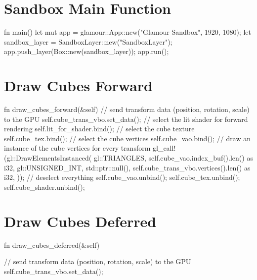 \newpage


\begin{appendices}
  \section{Sandbox Main Function}\label{app:sandbox-main}
  \begin{rustcode}
fn main() {
    let mut app = glamour::App::new("Glamour Sandbox", 1920, 1080);
    let sandbox_layer = SandboxLayer::new("SandboxLayer");
    app.push_layer(Box::new(sandbox_layer));
    app.run();
}
  \end{rustcode}

  \section{Draw Cubes Forward}\label{app:draw-cubes-forward}
  \begin{rustcode}
fn draw_cubes_forward(&self) {
    // send transform data (position, rotation, scale) to the GPU
    self.cube_trans_vbo.set_data();
    // select the lit shader for forward rendering
    self.lit_for_shader.bind();
    // select the cube texture
    self.cube_tex.bind();
    // select the cube vertices
    self.cube_vao.bind();
    // draw an instance of the cube vertices for every transform
    gl_call!(gl::DrawElementsInstanced(
        gl::TRIANGLES,
        self.cube_vao.index_buf().len() as i32,
        gl::UNSIGNED_INT,
        std::ptr::null(),
        self.cube_trans_vbo.vertices().len() as i32,
    ));
    // deselect everything
    self.cube_vao.unbind();
    self.cube_tex.unbind();
    self.cube_shader.unbind();
}
  \end{rustcode}

  \section{Draw Cubes Deferred}\label{app:draw-cubes-deferred}
  \begin{rustcode}
fn draw_cubes_deferred(&self) {
    // send transform data (position, rotation, scale) to the GPU
    self.cube_trans_vbo.set_data();

}
\end{rustcode}
\end{appendices}
